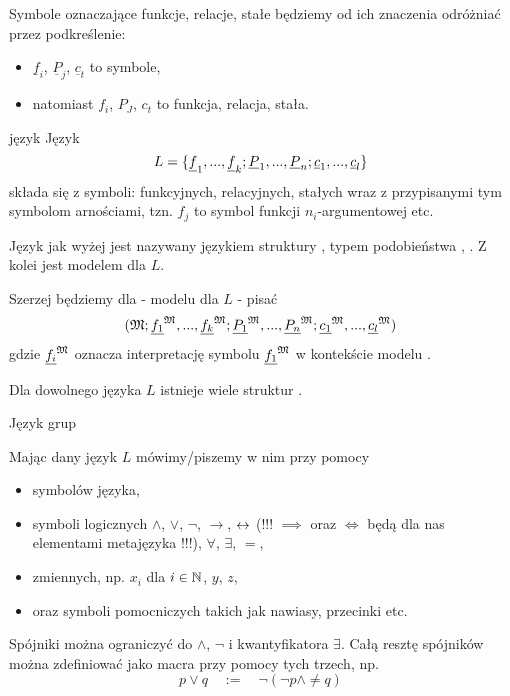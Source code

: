 Symbole oznaczające funkcje, relacje, stałe będziemy od ich znaczenia odróżniać przez podkreślenie:
\begin{itemize}
  \item $\underline{f}_i$, $\underline{P}_j$, $\underline{c}_t$ to symbole, 
  \item natomiast $f_i$, $P_J$, $c_t$ to funkcja, relacja, stała.
\end{itemize}

\begin{definition}{język}{}
  Język
  $$L=\{\underline{f}_1,...,\underline{f}_k;\underline{P}_1,..., \underline{P}_n; \underline{c}_1,...,\underline{c}_l\}$$
  składa się z symboli: funkcyjnych, relacyjnych, stałych wraz z przypisanymi tym symbolom arnościami, tzn. $f_j$ to symbol funkcji $n_i$-argumentowej etc.
\end{definition}

Język jak wyżej jest nazywany językiem struktury \Mm{}, typem podobieństwa \Mm{}, . Z kolei \Mm{} jest modelem dla $L$.

\begin{konwencja}{}{}
Szerzej będziemy dla \Mm{} - modelu dla $L$ - pisać
$$(\mathfrak{M}; \underline{f_1}^{\mathfrak{M}}, ..., \underline{f_k}^{\mathfrak{M}}; \underline{P_1}^{\mathfrak{M}},...,\underline{P_n}^{\mathfrak{M}}; \underline{c_1}^{\mathfrak{M}},...,\underline{c_l}^{\mathfrak{M}})$$
gdzie $\underline{f_i}^{\mathfrak{M}}$ oznacza interpretację symbolu $\underline{f_1}^{\mathfrak{M}}$ w kontekście modelu \Mm.
\end{konwencja}

\begin{remark}{}{}
  Dla dowolnego języka $L$ istnieje wiele struktur \Mm.
\end{remark}

\begin{example}
  Język grup
\end{example}

Mając dany język $L$ mówimy/piszemy w nim przy pomocy
\begin{itemize}
  \item symbolów języka,
  \item symboli logicznych $\land$, $\lor$, $\neg$, $\to$, $\leftrightarrow$ (!!! $\implies$ oraz $\iff$ będą dla nas elementami metajęzyka !!!), $\forall$, $\exists$, $=$,
  \item zmiennych, np. $x_i$ dla $i\in \mathbb{N}$, $y$, $z$,
  \item oraz symboli pomocniczych takich jak nawiasy, przecinki etc.
\end{itemize}

\begin{remark}{}{}
  Spójniki można ograniczyć do $\land$, $\neg$ i kwantyfikatora $\exists$. Całą resztę spójników można zdefiniować jako macra przy pomocy tych trzech, np.
  $$p\lor q\quad :=\quad \neg(\neg p\land \neq q)$$
\end{remark}

